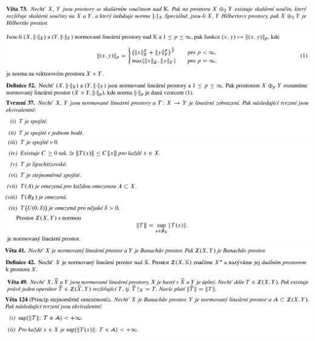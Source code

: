 \documentclass[12pt,a4paper]{article}
\begin{document}
\begin{center}
		\includegraphics[width=\textwidth]{img/2banHilb/2020-06-20 17 19 12.png}\vspace{0.3cm}
		\includegraphics[width=\textwidth]{img/2banHilb/2020-06-20 17 19 36.png}\vspace{0.3cm}
		\includegraphics[width=\textwidth]{img/2banHilb/2020-06-20 17 20 29.png}\vspace{0.3cm}
		\includegraphics[width=\textwidth]{img/2banHilb/2020-06-20 17 20 42.png}\vspace{0.3cm}
		\includegraphics[width=\textwidth]{img/2banHilb/2020-06-20 17 21 19.png}\vspace{0.3cm}
		\includegraphics[width=\textwidth]{img/2banHilb/2020-06-20 17 21 26.png}\vspace{0.3cm}
		\includegraphics[width=\textwidth]{img/2banHilb/2020-06-20 17 22 08.png}\vspace{0.3cm}
		\includegraphics[width=\textwidth]{img/2banHilb/2020-06-20 17 29 56.png}\vspace{0.3cm}

\end{center}
\end{document}
